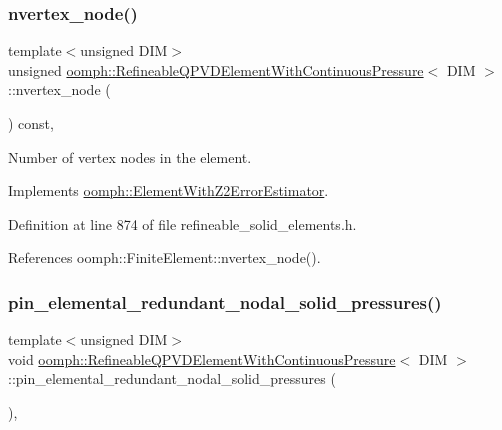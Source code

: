 \subsubsection{\texorpdfstring{nvertex\+\_\+node()}{nvertex\_node()}}
{\footnotesize\ttfamily template$<$unsigned D\+IM$>$ \\
unsigned \hyperlink{classoomph_1_1RefineableQPVDElementWithContinuousPressure}{oomph\+::\+Refineable\+Q\+P\+V\+D\+Element\+With\+Continuous\+Pressure}$<$ D\+IM $>$\+::nvertex\+\_\+node (\begin{DoxyParamCaption}{ }\end{DoxyParamCaption}) const\hspace{0.3cm}{\ttfamily [inline]}, {\ttfamily [virtual]}}



Number of vertex nodes in the element. 



Implements \hyperlink{classoomph_1_1ElementWithZ2ErrorEstimator_a19495a0e77ef4ff35f15fdf7913b4077}{oomph\+::\+Element\+With\+Z2\+Error\+Estimator}.



Definition at line 874 of file refineable\+\_\+solid\+\_\+elements.\+h.



References oomph\+::\+Finite\+Element\+::nvertex\+\_\+node().

\mbox{\label{classoomph_1_1RefineableQPVDElementWithContinuousPressure_a5f2c7682c947acf7ce7689a30d31f48a}} 
\subsubsection{\texorpdfstring{pin\+\_\+elemental\+\_\+redundant\+\_\+nodal\+\_\+solid\+\_\+pressures()}{pin\_elemental\_redundant\_nodal\_solid\_pressures()}}
{\footnotesize\ttfamily template$<$unsigned D\+IM$>$ \\
void \hyperlink{classoomph_1_1RefineableQPVDElementWithContinuousPressure}{oomph\+::\+Refineable\+Q\+P\+V\+D\+Element\+With\+Continuous\+Pressure}$<$ D\+IM $>$\+::pin\+\_\+elemental\+\_\+redundant\+\_\+nodal\+\_\+solid\+\_\+pressures (\begin{DoxyParamCaption}{ }\end{DoxyParamCaption})\hspace{0.3cm}{\ttfamily [inline]}, {\ttfamily [virtual]}}



